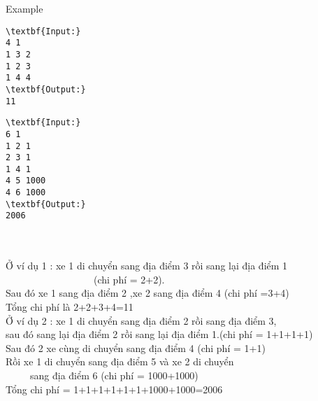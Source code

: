 Example
\begin{verbatim}
\textbf{Input:} 
4 1
1 3 2
1 2 3
1 4 4
\textbf{Output:}
11
\end{verbatim}
\begin{verbatim}
\textbf{Input:} 
6 1
1 2 1
2 3 1
1 4 1
4 5 1000
4 6 1000
\textbf{Output:}
2006\end{verbatim}


\\
\\Ở ví dụ 1 : xe 1 di chuyển sang địa điểm 3 rồi sang lại địa điểm 1
\\                  (chi phí = 2+2).
\\Sau đó xe 1 sang địa điểm 2 ,xe 2 sang địa điểm 4 (chi phí =3+4)
\\Tổng chi phí là 2+2+3+4=11
\\Ở ví dụ 2 : xe 1 di chuyển sang địa điểm 2 rồi sang địa điểm 3,
\\sau đó sang lại địa điểm 2 rồi sang lại địa điểm 1.(chi phí = 1+1+1+1)
\\Sau đó 2 xe cùng di chuyển sang địa điểm 4 (chi phí = 1+1)
\\Rồi xe 1 di chuyển sang địa điểm 5 và xe 2 di chuyển
\\     sang địa điểm 6 (chi phí = 1000+1000)
\\Tổng chi phí = 1+1+1+1+1+1+1000+1000=2006
\\
\\ 

 